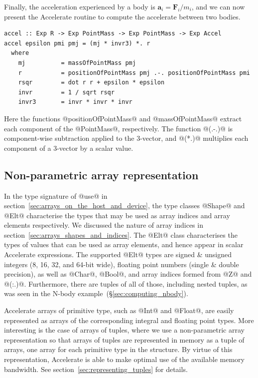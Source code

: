 Finally, the acceleration experienced by a body is $\mathbf{a}_i =
\mathbf{F}_i/m_i$, and we can now present the Accelerate routine to compute the
accelerate between two bodies.
%
%
%
\begin{lstlisting}[style=haskell]
accel :: Exp R -> Exp PointMass -> Exp PointMass -> Exp Accel
accel epsilon pmi pmj = (mj * invr3) *. r
  where
    mj          = massOfPointMass pmj
    r           = positionOfPointMass pmj .-. positionOfPointMass pmi
    rsqr        = dot r r + epsilon * epsilon
    invr        = 1 / sqrt rsqr
    invr3       = invr * invr * invr
\end{lstlisting}
%
Here the functions @positionOfPointMass@ and @massOfPointMass@ extract each
component of the @PointMass@, respectively. The function @(.-.)@ is
component-wise subtraction applied to the 3-vector, and @(*.)@ multiplies each
component of a 3-vector by a scalar value.


\subsection{Non-parametric array representation}

In the type signature of @use@ in
section~\ref{sec:arrays_on_the_host_and_device}, the type classes @Shape@ and
@Elt@ characterise the types that may be used as array indices and array
elements respectively. We discussed the nature of array indices in
section~\ref{sec:arrays_shapes_and_indices}. The @Elt@ class characterises the types
of values that can be used as array elements, and hence appear in scalar
Accelerate expressions. The supported @Elt@ types are signed \& unsigned integers (8,
16, 32, and 64-bit wide), floating point numbers (single \& double precision),
as well as @Char@, @Bool@, and array indices formed from @Z@ and @(:.)@.
Furthermore, there are tuples of all of those, including nested tuples, as was
seen in the N-body example~(\S\ref{sec:computing_nbody}).

Accelerate arrays of primitive type, such as @Int@ and @Float@, are easily
represented as arrays of the corresponding integral and floating point types.
More interesting is the case of arrays of tuples, where we use a non-parametric
array representation so that arrays of tuples are represented in memory as a
tuple of arrays, one array for each primitive type in the structure. By virtue
of this representation, Accelerate is able to make optimal use of the available
memory bandwidth. See section~\ref{sec:representing_tuples} for details.

